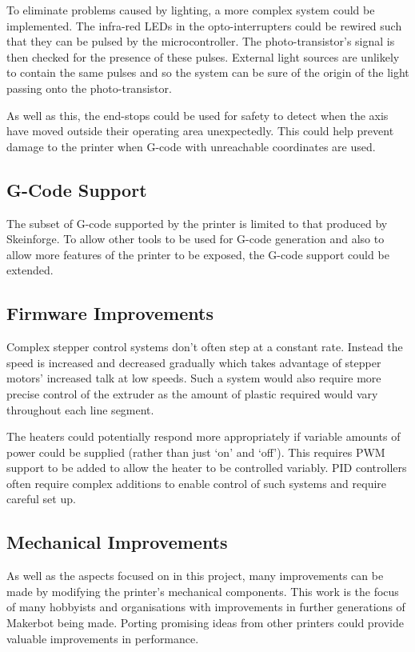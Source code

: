 			To eliminate problems caused by lighting, a more complex system could be
			implemented.  The infra-red LEDs in the opto-interrupters could be rewired
			such that they can be pulsed by the microcontroller. The
			photo-transistor's signal is then checked for the presence of these
			pulses. External light sources are unlikely to contain the same pulses and
			so the system can be sure of the origin of the light passing onto the
			photo-transistor.
			
			As well as this, the end-stops could be used for safety to detect when the
			axis have moved outside their operating area unexpectedly. This could help
			prevent damage to the printer when G-code with unreachable coordinates are
			used.
			
		\subsection{G-Code Support}
			
			The subset of G-code supported by the printer is limited to that produced
			by Skeinforge. To allow other tools to be used for G-code generation and
			also to allow more features of the printer to be exposed, the G-code
			support could be extended.
		
		\subsection{Firmware Improvements}
			
			\label{sec:future_firmware}
			
			
			Complex stepper control systems don't often step at a constant rate.
			Instead the speed is increased and decreased gradually which takes
			advantage of stepper motors' increased talk at low speeds. Such a system
			would also require more precise control of the extruder as the amount of
			plastic required would vary throughout each line segment.
			
			
			The heaters could potentially respond more appropriately if variable
			amounts of power could be supplied (rather than just `on' and `off'). This
			requires PWM support to be added to allow the heater to be controlled
			variably. PID controllers often require complex additions to enable
			control of such systems and require careful set up.
			
		\subsection{Mechanical Improvements}
			
			As well as the aspects focused on in this project, many improvements can
			be made by modifying the printer's mechanical components. This work is the
			focus of many hobbyists and organisations with improvements in further
			generations of Makerbot being made. Porting promising ideas from other
			printers could provide valuable improvements in performance.
			
